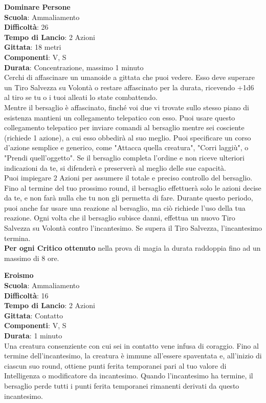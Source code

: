 \begin{multicols}{2}
\medskip\textbf{Dominare Persone}\\
\textbf{Scuola}: Ammaliamento\\
\textbf{Difficoltà}: 26\\
\textbf{Tempo di Lancio}: 2 Azioni\\
\textbf{Gittata}: 18 metri\\
\textbf{Componenti}: V, S\\
\textbf{Durata}: Concentrazione, massimo 1 minuto\\
Cerchi di affascinare un umanoide a gittata che puoi vedere. Esso deve superare un Tiro Salvezza su Volontà o restare affascinato per la durata, ricevendo +1d6 al tiro se tu o i tuoi alleati lo state combattendo.\\
Mentre il bersaglio è affascinato, finché voi due vi trovate sullo stesso piano di esistenza mantieni un collegamento telepatico con esso. Puoi usare questo collegamento telepatico per inviare comandi al bersaglio mentre sei cosciente (richiede 1 azione), a cui esso obbedirà al suo meglio. Puoi specificare un corso d'azione semplice e generico, come "Attacca quella creatura", "Corri laggiù", o "Prendi quell'oggetto". Se il bersaglio completa l'ordine e non riceve ulteriori indicazioni da te, si difenderà e preserverà al meglio delle sue capacità.\\
Puoi impiegare 2 Azioni per assumere il totale e preciso controllo del bersaglio. Fino al termine del tuo prossimo round, il bersaglio effettuerà solo le azioni decise da te, e non farà nulla che tu non gli permetta di fare. Durante questo periodo, puoi anche far usare una reazione al bersaglio, ma ciò richiede l'uso della tua reazione. Ogni volta che il bersaglio subisce danni, effettua un nuovo Tiro Salvezza su Volontà contro l'incantesimo. Se supera il Tiro Salvezza, l'incantesimo termina.\\
\textbf{Per ogni Critico ottenuto} nella prova di magia la durata raddoppia fino ad un massimo di 8 ore.

\medskip\textbf{Eroismo}\\
\textbf{Scuola}: Ammaliamento\\
\textbf{Difficoltà}: 16\\
\textbf{Tempo di Lancio}: 2 Azioni\\
\textbf{Gittata}: Contatto\\
\textbf{Componenti}: V, S\\
\textbf{Durata}: 1 minuto\\
Una creatura consenziente con cui sei in contatto vene infusa di coraggio. Fino al termine dell'incantesimo, la creatura è immune all'essere spaventata e, all'inizio di ciascun suo round, ottiene punti ferita temporanei pari al tuo valore di Intelligenza o modificatore da incantesimo. Quando l'incantesimo ha termine, il bersaglio perde tutti i punti ferita temporanei rimanenti derivati da questo incantesimo.


\end{multicols}
